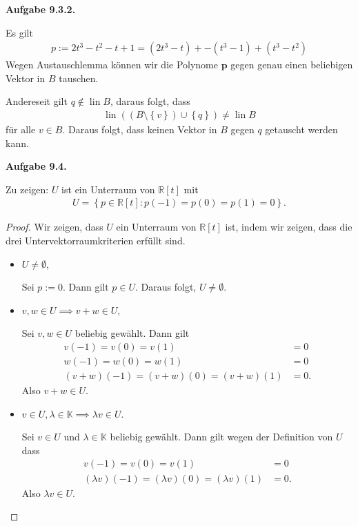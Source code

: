 \documentclass[12pt]{extarticle}
\newcommand{\mg}[1]{\mathbb{#1}}
\newcommand{\lin}{\operatorname{lin}}
\newcommand{\aufgn}[1]{\textbf{Aufgabe #1.}}
\begin{document}
\aufgn{9.3.2}

Es gilt
\begin{align*}
p := 2t^3 - t^2 - t + 1 = (2t^3 - t) + -(t^3 -
  1) + (t^3 - t^2)
\end{align*}
Wegen Austauschlemma können wir die Polynome
\(\mathbf{p}\) gegen genau einen beliebigen Vektor in \(B\)
tauschen.

Andereseit  gilt \(q \notin \lin B\),  daraus folgt, dass
\begin{align*}
\lin \left( (B \setminus \left\{ v \right\}) \cup
  \left\{ q \right\}  \right) \ne \lin B
\end{align*}
für alle \(v \in B\).  Daraus folgt, dass keinen Vektor
in \(B\) gegen \(q\) getauscht werden kann.

\aufgn{9.4}

Zu zeigen: \(U\) ist ein Unterraum von \(\mg{R}[t]\) mit
\begin{align*}
U = \left\{ p \in \mg{R}[t] \colon p(-1) = p(0) = p(1)
  = 0 \right\}.
\end{align*}

\begin{proof}
Wir zeigen, dass \(U\) ein Unterraum von \(\mg{R}[t]\) ist,
indem wir zeigen, dass die drei
Untervektorraumkriterien erfüllt sind.

\begin{itemize}
\item \(U \ne \emptyset\),

  Sei \(p := 0\).  Dann gilt \(p \in U\).  Daraus folgt, $U
  \ne \emptyset$.
\item \(v, w \in U \implies v + w \in U\),

  Sei \(v, w \in U\) beliebig gewählt.  Dann gilt
\begin{align*}
  v(-1) = v(0) = v(1) &= 0\\
  w(-1) = w(0) = w(1) &= 0\\
  (v+w)(-1) = (v+w)(0) = (v+w)(1) &= 0.
\end{align*}
Also \(v+w \in U\).
\item $v \in U, \lambda \in \mg{K} \implies \lambda v
  \in U$.

  Sei \(v \in U\) und \(\lambda \in \mg{K}\) beliebig
  gewählt.  Dann gilt wegen der Definition von \(U\) dass
\begin{align*}
  v(-1) = v(0) = v(1) &= 0\\
  (\lambda v)(-1) = (\lambda v)(0) = (\lambda v)(1) &= 0.
\end{align*}
Also \(\lambda v \in U\).
\end{itemize}
\end{proof}
\end{document}
